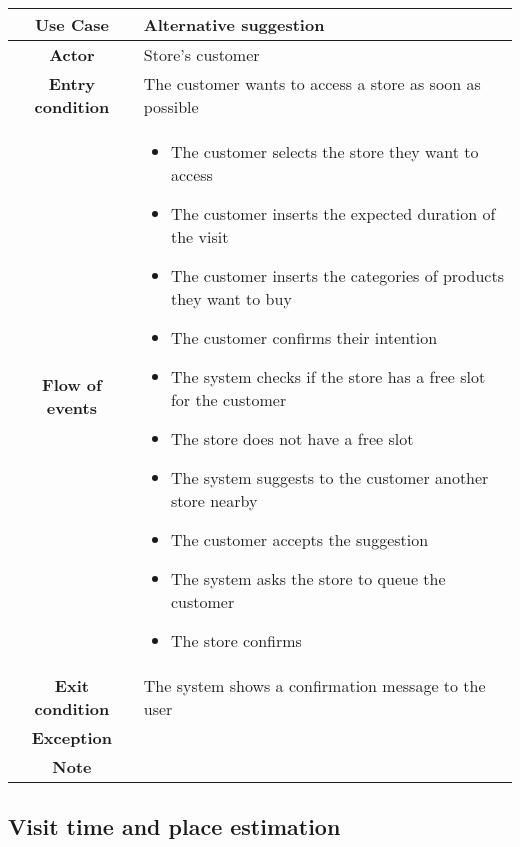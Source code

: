 \documentclass[../../main.tex]{subfiles}
\begin{document}
    \begin{table}[H]
      \centering
        \begin{tabular}{c m{}}
        \hline
        \textbf{Use Case} & Alternative suggestion\\ \hline
        \textbf{Actor} & Store's customer\\ \hline
        \textbf{Entry condition} & The customer wants to access a store as soon as possible\\  \hline
        \textbf{Flow of events} & \begin{itemize}
                                    \item The customer selects the store they want to access
                                    \item The customer inserts the expected duration of the visit
                                    \item The customer inserts the categories of products they want to buy
                                    \item The customer confirms their intention
                                    \item The system checks if the store has a free slot for the customer
                                    \item The store does not have a free slot
                                    \item The system suggests to the customer another store nearby
                                    \item The customer accepts the suggestion
                                    \item The system asks the store to queue the customer
                                    \item The store confirms
                                  \end{itemize}\\ \hline
        \textbf{Exit condition} & The system shows a confirmation message to the user \\ \hline
        \textbf{Exception} & \\ \hline
        \textbf{Note} & \\ \hline
        \end{tabular}
    \end{table}

    \subsection*{Visit time and place estimation}
\end{document}
